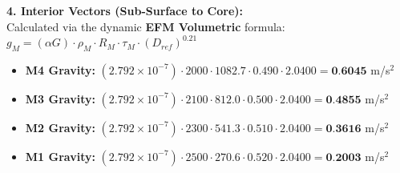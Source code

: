 \documentclass[11pt, a4paper]{article}
\begin{document}
  \vspace{0.5em}
  \noindent \textbf{4. Interior Vectors (Sub-Surface to Core):} \\[0.5em]
  \hspace*{1em} Calculated via the dynamic \textbf{EFM Volumetric} formula: $g_M = (\alpha G) \cdot \rho_{M} \cdot R_M \cdot \tau_M \cdot (D_{ref})^{0.21}$
  \begin{itemize}
    \item \textbf{M4 Gravity:} $(2.792 \times 10^{-7}) \cdot 2000 \cdot 1082.7 \cdot 0.490 \cdot 2.0400 = \textbf{0.6045}$ m/s$^2$
    \item \textbf{M3 Gravity:} $(2.792 \times 10^{-7}) \cdot 2100 \cdot 812.0 \cdot 0.500 \cdot 2.0400 = \textbf{0.4855}$ m/s$^2$
    \item \textbf{M2 Gravity:} $(2.792 \times 10^{-7}) \cdot 2300 \cdot 541.3 \cdot 0.510 \cdot 2.0400 = \textbf{0.3616}$ m/s$^2$
    \item \textbf{M1 Gravity:} $(2.792 \times 10^{-7}) \cdot 2500 \cdot 270.6 \cdot 0.520 \cdot 2.0400 = \textbf{0.2003}$ m/s$^2$
  \end{itemize}
\end{document}
